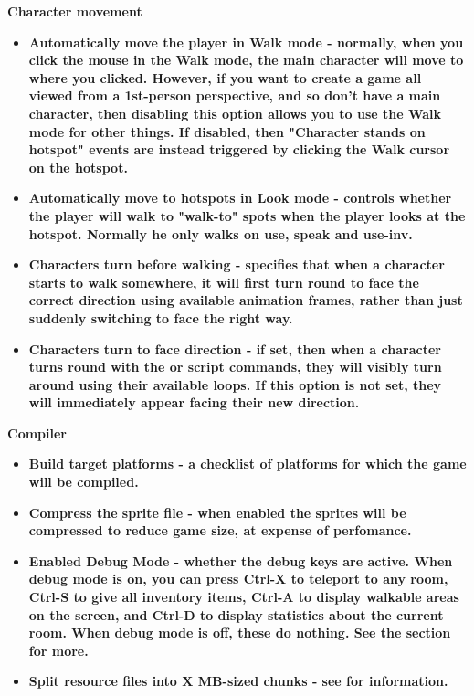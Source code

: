 \bf{Character movement}
\begin{itemize}
\item \bf{Automatically move the player in Walk mode} - normally, when you click the mouse in
the Walk mode, the main character will move to where you clicked. However,
if you want to create a game all viewed from a 1st-person perspective, and
so don't have a main character, then disabling this option allows you to
use the Walk mode for other things. If disabled, then "Character stands on
hotspot" events are instead triggered by clicking the Walk cursor on the
hotspot.
\item \bf{Automatically move to hotspots in Look mode} - controls whether the player will walk
to "walk-to" spots when the player looks at the hotspot. Normally he only
walks on use, speak and use-inv.
\item \bf{Characters turn before walking} - specifies that when a character starts
to walk somewhere, it will first turn round to face the correct direction
using available animation frames, rather than just suddenly switching to
face the right way.
\item \bf{Characters turn to face direction} - if set, then when a character turns round
with the  or 
script commands, they will visibly turn around using their available loops.
If this option is not set, they will immediately appear facing their new direction.
\end{itemize}

\bf{Compiler}
\begin{itemize}
\item \bf{Build target platforms} - a checklist of platforms for which the game will be compiled.
\item \bf{Compress the sprite file} - when enabled the sprites will be compressed to reduce game size, at expense of perfomance.
\item \bf{Enabled Debug Mode} - whether the debug keys are active. When debug mode is on,
you can press Ctrl-X to teleport to any room, Ctrl-S to give all inventory
items, Ctrl-A to display walkable areas on the screen, and Ctrl-D to display
statistics about the current room. When debug mode is off, these do nothing.
See the  section for more.
\item \bf{Split resource files into X MB-sized chunks} - see  for information.
\end{itemize}

